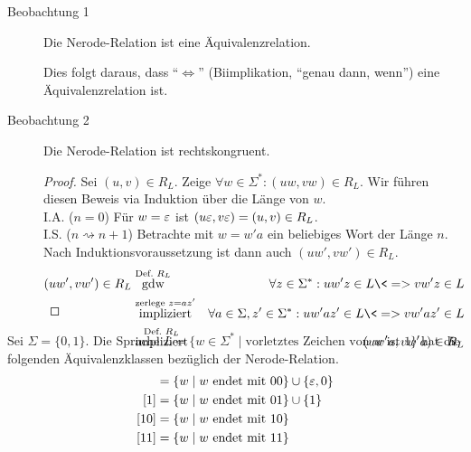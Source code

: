 \begin{description}
 \item[Beobachtung 1] Die Nerode-Relation ist eine Äquivalenzrelation.
 
 Dies folgt daraus, dass "`$\Leftrightarrow$"' (Biimplikation, "`genau dann, wenn"') eine Äquivalenzrelation ist.
 \item[Beobachtung 2] Die Nerode-Relation ist rechtskongruent.
                \begin{proof}
                Sei $(u,v)\in R_L$. Zeige $\forall w\in\Sigma^*: (uw,vw)\in R_L$.
                Wir führen diesen Beweis via Induktion über die Länge von $w$.\\
                I.A. ($n=0$) Für $w=\varepsilon$ ist $ (u\varepsilon,v\varepsilon)=(u,v)\in R_L$.\\
                I.S. ($n\rightsquigarrow n+1$) Betrachte mit $w=w'a$ ein beliebiges Wort der Länge $n$.
                Nach Induktionsvoraussetzung ist dann auch $(uw', vw') \in R_L $.
                \begin{eqnarray*}
		(uw',vw')\in R_L 
		& \stackrel{\text{Def.\ } R_L}{\text{gdw}} & \forall z\in\Sigma^*: uw'z\in L \<=> vw'z\in L\\
		& \stackrel{\text{zerlege } z=az'}{\text{impliziert}} & \forall a\in \Sigma, z'\in\Sigma^*: uw'az'\in L \<=> vw'az'\in L\\
		& \stackrel{\text{Def.\ } R_L}{\text{impliziert}} & (uw'a,vw'a)\in R_L
		\qedherefixeqnarray
	      \end{eqnarray*}
              \end{proof}
\end{description}

\begin{Bsp}
Sei $\Sigma=\{0,1\}$. Die Sprache $L=\{w\in\Sigma^*\mid \text{vorletztes Zeichen von $w$ ist } 1\}$ hat die folgenden Äquivalenzklassen bezüglich der Nerode-Relation.
        \begin{align*}
        [\Eps] &= \{w\mid w \text{ endet mit } 00 \} \cup \{\varepsilon, 0\}\\
        [1] &= \{w\mid w \text{ endet mit } 01 \} \cup \{1\}\\
        [10] &= \{w\mid w \text{ endet mit } 10 \}\\
        [11] &= \{w\mid w \text{ endet mit } 11 \}
        \qedhere
        \end{align*}
\end{Bsp}

